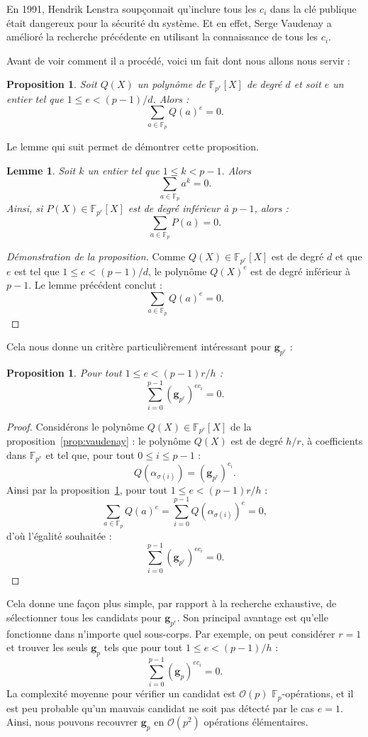 \documentclass[a4paper, titlepage, 11pt]{article}
\newtheorem{lemm}[theo]{Lemme}
\newtheorem{prop}[theo]{Proposition}
\theoremstyle{definition}
\theoremstyle{remark}
\def\O{\mathcal O}
\def\gf #1{\mathbb{F}_{#1}}
\def\mbf #1{\mathbf{#1}}
\begin{document}
En 1991, Hendrik Lenstra \cite{lenstra1991} soupçonnait qu'inclure tous les $c_i$ dans la clé publique était dangereux pour la sécurité du système. Et en effet, Serge Vaudenay a amélioré la recherche précédente en utilisant la connaissance de tous les $c_i$.

Avant de voir comment il a procédé, voici un fait dont nous allons nous servir :

\begin{prop}\label{prop:faitCool}
Soit $Q(X)$ un polynôme de $\gf{p^r}[X]$ de degré $d$ et soit $e$ un entier tel que $1 \leqslant e < (p-1)/d$. Alors : $$\sum_{a \in \gf{p}} Q(a)^e = 0.$$
\end{prop}
Le lemme qui suit permet de démontrer cette proposition.

\begin{lemm}
Soit $k$ un entier tel que $1 \leqslant k < p-1$. Alors
$$\sum_{a\in\gf{p}} a^k = 0.$$
Ainsi, si $P(X) \in \gf{p^r}[X]$ est de degré inférieur à $p-1$, alors : $$\sum_{a\in\gf{p}} P(a) = 0.$$
\end{lemm}

\begin{proof}[Démonstration de la proposition]
Comme $Q(X) \in \gf{p^r}[X]$ est de degré $d$ et que $e$ est tel que $1\leqslant e < (p-1)/d$, le polynôme $Q(X)^e$ est de degré inférieur à $p-1$. Le lemme précédent conclut :
$$\sum_{a\in\gf{p}} Q(a)^e = 0.$$
\end{proof}

Cela nous donne un critère particulièrement intéressant pour $\mbf g_{p^r}$ :
\begin{prop}
Pour tout $1 \leqslant e < (p-1)r/h$ :
$$\sum_{i=0}^{p-1} (\mbf g_{p^r})^{ec_i} = 0.$$
\end{prop}
\begin{proof}
Considérons le polynôme $Q(X)\in\gf{p^r}[X]$ de la proposition~\ref{prop:vaudenay} : le polynôme $Q(X)$ est de degré $h/r$, à coefficients dans $\gf{p^r}$ et tel que, pour tout $0 \leqslant i \leqslant p-1$ :
$$Q\left(\alpha_{\sigma(i)}\right) = (\mbf g_{p^r})^{c_i}.$$
Ainsi par la proposition~\ref{prop:faitCool}, pour tout $1 \leqslant e < (p-1)r/h$ :
$$\sum_{a\in\gf{p}} Q(a)^e = \sum_{i=0}^{p-1} Q\left(\alpha_{\sigma(i)}\right)^e = 0,$$
d'où l'égalité souhaitée :
$$\sum_{i=0}^{p-1} (\mbf g_{p^r})^{ec_i} = 0.$$
\end{proof}
\noindent Cela donne une façon plus simple, par rapport à la recherche exhaustive, de sélectionner tous les candidats pour $\mbf g_{p^r}$. Son principal avantage est qu'elle fonctionne dans n'importe quel sous-corps. Par exemple, on peut considérer $r=1$ et trouver les seuls $\mbf g_p$ tels que pour tout $1 \leqslant e < (p-1)/h$ :
$$\sum_{i=0}^{p-1} (\mbf g_p)^{ec_i} = 0.$$
La complexité moyenne pour vérifier un candidat est $\O(p)$ $\gf{p}$-opérations, et il est peu probable qu'un mauvais candidat ne soit pas détecté par le cas $e = 1$. Ainsi, nous pouvons recouvrer $\mbf g_p$ en $\O(p^2)$ opérations élémentaires.
\end{document}
